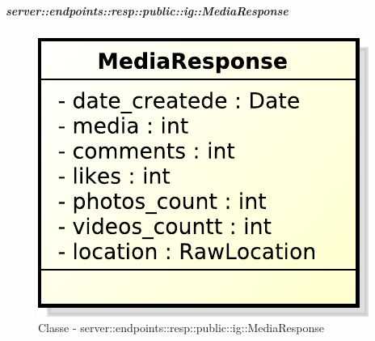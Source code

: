     \subparagraph{server::endpoints::resp::public::ig::MediaResponse} %
    \label{subp:bdsm_app_server_endpoints_resp_public_ig_mediaresponse}
  \begin{figure}[!htbp]
    \centering
    \centerline{\includegraphics[scale=0.6]{./images/server/classes/endpoints/ig/media_response.pdf}}
    \caption{Classe - server::endpoints::resp::public::ig::MediaResponse}
  \end{figure}
